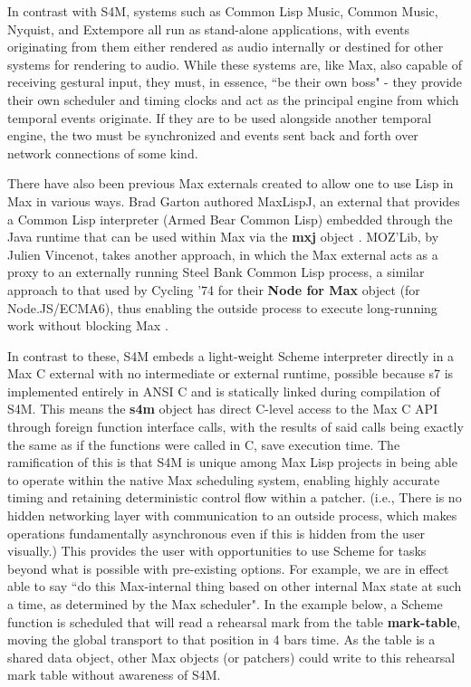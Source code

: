 \documentclass[acmsmall]{acmart}
\begin{document}
In contrast with S4M, systems such as Common Lisp Music, Common Music, Nyquist, and Extempore
all run as stand-alone applications, with events originating from them either
rendered as audio internally or destined for other systems for rendering to audio. 
While these systems are, like Max, also capable
of receiving gestural input, they must, in essence, ``be their own boss" - they provide
their own scheduler and timing clocks and act as the principal engine from which temporal
events originate. If they are to be used alongside another temporal engine, the two
must be synchronized and events sent back and forth over network connections of some kind.

There have also been previous Max externals created to allow one to use Lisp in Max in various ways.
Brad Garton authored MaxLispJ, an external that provides a Common Lisp interpreter 
(Armed Bear Common Lisp) embedded through the Java runtime that can be used within Max 
via the \textbf{mxj} object \cite{Garton2011}.
MOZ'Lib, by Julien Vincenot, takes another approach, in which the Max external
acts as a proxy to an externally running Steel Bank Common Lisp process,
a similar approach to that used by Cycling '74 for their \textbf{Node for Max} object (for Node.JS/ECMA6), 
thus enabling the outside process to execute long-running work without blocking Max \cite{Vincenot2017}.

In contrast to these, S4M embeds a light-weight Scheme interpreter directly in a Max
C external with no intermediate or external runtime, possible because s7 is implemented entirely
in ANSI C and is statically linked during compilation of S4M. 
This means the \textbf{s4m} object has direct C-level access to the Max C API 
through foreign function interface calls, with the results of said calls being exactly 
the same as if the functions were called in C, save execution time. 
The ramification of this is that S4M is unique among Max Lisp projects in being
able to operate within the native Max scheduling system, enabling highly accurate
timing and retaining deterministic control flow within a patcher. (i.e., There
is no hidden networking layer with communication to an outside process, which 
makes operations fundamentally asynchronous even if this is hidden from the user visually.)
This provides the user with opportunities to use Scheme for tasks beyond
what is possible with pre-existing options. For example, we are in effect 
able to say ``do this Max-internal thing based on other internal Max state at such a time,
as determined by the Max scheduler". In the example below, a Scheme function
is scheduled that will read a rehearsal mark from the table \textbf{mark-table},
moving the global transport to that position in 4 bars time. As the table
is a shared data object, other Max objects (or patchers) could write to this
rehearsal mark table without awareness of S4M.
\end{document}
